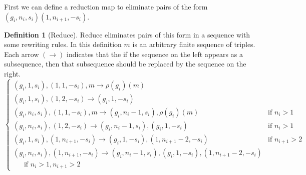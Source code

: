 \documentclass[12pt]{article} %
\theoremstyle{definition}
\theoremstyle{definition}
\theoremstyle{definition}
\theoremstyle{definition}
\newtheorem{defn}[thm]{Definition}
\begin{document}
First we can define a reduction map to eliminate pairs of the form
 $(g_i, n_i, s_i)(1, n_{i+1}, -s_i)$.
\begin{defn}[Reduce]
  Reduce eliminates pairs of this form in a sequence with some rewriting rules.
  In this definition $m$ is an arbitrary finite sequence of triples. Each arrow $(\to)$ indicates
  that the if the sequence on the left appears as a subsequence, then
  that subsequence should be replaced by the sequence on the right.
  \begin{equation}
    \begin{cases}
    (g_i, 1, s_i), (1, 1, -s_i), m \to \rho(g_i)(m) \\
    (g_i, 1, s_i), (1, 2, -s_i) \to
      (g_i, 1, -s_i) &  \\
    (g_i, n_i, s_i), (1, 1, -s_i), m \to (g_i, n_i - 1, s_i),
      \rho(g_i)(m) & \text{if } n_i > 1\\
    (g_i, n_i, s_i), (1, 2, -s_i) \to (g_i, n_i - 1, s_i), (g_i, 1, -s_i) & \text{if } n_i > 1\\
    (g_i, 1, s_i), (1, n_{i+1}, -s_i) \to
      (g_i, 1, -s_i), (1, n_{i+1} - 2, -s_i) &\text{if } n_{i+1} > 2 \\
    (g_i, n_i, s_i), (1, n_{i+1}, -s_i) \to
    (g_i, n_i - 1, s_i), (g_i, 1, -s_i), (1, n_{i + 1} - 2, -s_i) \\ \ \ \ \ \ \ \
      \text{if } n_i > 1, n_{i+1} > 2
    \end{cases}
  \end{equation}

\end{defn}
\end{document}
